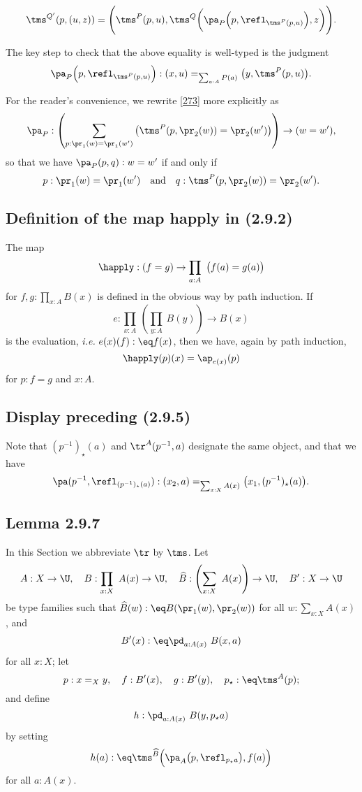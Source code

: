 \documentclass[12pt]{article}
\begin{document}
\begin{equation}\label{ld}
\tms^{Q'}(p,(u,z))=\Bigg(\tms^P(p,u),\tms^Q\bigg(\pa_P\Big(p,\refl_{\tms^P(p,u)}\Big),z\bigg)\Bigg).
\end{equation}

The key step to check that the above equality is well-typed is the judgment 
$$
\pa_P\Big(p,\refl_{\tms^P(p,u)}\Big):(x,u)=_{\sum_{a:A}P(a)}\big(y,\tms^P(p,u)\big).
$$ 

For the reader's convenience, we rewrite \eqref{273} more explicitly as 
$$
\pa_P:\left(\sum_{p:\pr_1(w)=\pr_1(w')}\big(\tms^P(p,\pr_2(w))=\pr_2(w')\big)\right)\to(w=w'),
$$ 
so that we have $\pa_P(p,q):w=w'$ if and only if 
$$
p:\pr_1(w)=\pr_1(w')\quad\text{and}\quad q:\tms^P(p,\pr_2(w))=\pr_2(w').
$$


\subsection{Definition of the map \textsf{happly} in (2.9.2)}

The map 
$$
\happly:(f=g)\to\prod_{a:A}\ \big(f(a)=g(a)\big)
$$ 
for $f,g:\prod_{x:A}B(x)$ is defined in the obvious way by path induction. If 
$$
e:\prod_{x:A}\ \left(\prod_{y:A}\ B(y)\right)\to B(x)
$$ 
is the evaluation, \emph{i.e.} $e(x)(f):\eq f(x)$, then we have, again by path induction, 
$$
\happly(p)(x)=\ap_{e(x)}(p)
$$ 
for $p:f=g$ and $x:A$. 


\subsection{Display preceding (2.9.5)}

Note that $(p^{-1})_\star(a)$ and $\tr^A(p^{-1},a)$ designate the same object, and that we have 
$$
\pa(p^{-1},\refl_{(p^{-1})_\star(a)}):(x_2,a)=_{\sum_{x:X}A(x)}\big(x_1,(p^{-1})_\star(a)\big).
$$ 


\subsection{Lemma 2.9.7}


In this Section we abbreviate $\tr$ by $\tms$. Let 
$$
A:X\to\U,\quad B:\prod_{x:X}\ A(x)\to\U,\quad\widehat B:\left(\sum_{x:X}\ A(x)\right)\to\U,\quad B':X\to\U
$$ 
be type families such that $\widehat B(w):\eq B(\pr_1(w),\pr_2(w))$ for all $w:\sum_{x:X}A(x)$, and 
$$
B'(x):\eq\pd_{a:A(x)}\ B(x,a)
$$ 
for all $x:X$; let 
$$
p:x=_Xy,\quad f:B'(x),\quad g:B'(y),\quad p_\star:\eq\tms^A(p);
$$ 
and define 
$$
h:\pd_{a:A(x)}\ B(y,p_\star a)
$$ 
by setting 
\begin{equation}\label{ha}
h(a):\eq\tms^{\widehat B}\Big(\pa_A\big(p,\refl_{p_\star a}\big),f(a)\Big)
\end{equation}
for all $a:A(x)$. 
\end{document}
